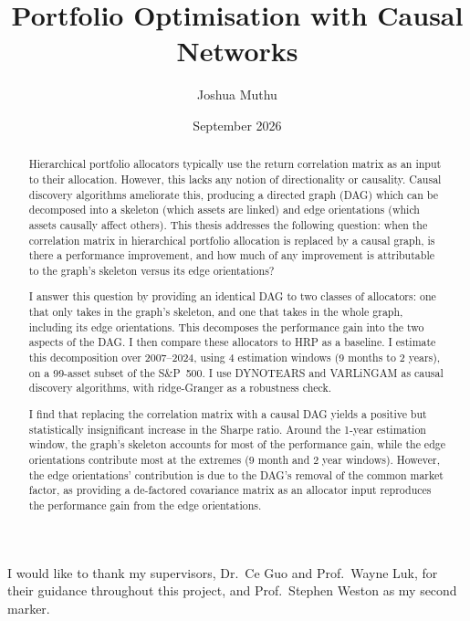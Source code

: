 \documentclass[12pt, a4paper]{report}
\title{Portfolio Optimisation with Causal Networks}
\author{Joshua Muthu}
\date{September 2026}
\begin{document}

\maketitle

\begin{abstract}
\noindent Hierarchical portfolio allocators typically use 
the return correlation matrix as an input to their allocation. 
However, this lacks any notion of directionality or causality.
Causal discovery algorithms ameliorate this, producing
a directed graph (DAG) which can be decomposed into a skeleton
(which assets are linked) and edge orientations
(which assets causally affect others).
This thesis addresses the following question: when the
correlation matrix in hierarchical portfolio allocation is
replaced by a causal graph, is there a performance
improvement, and how much of any improvement is attributable
to the graph's skeleton versus its edge orientations?

I answer this question by providing an identical DAG to
two classes of allocators: one that only takes in the graph's
skeleton, and one that takes in the whole graph, including its
edge orientations. This decomposes the performance gain into
the two aspects of the DAG. I then compare these allocators
to HRP as a baseline. I estimate this decomposition over 
2007--2024, using 4 estimation windows 
(9 months to 2 years), on a 99-asset subset of the S\&P~500. 
I use DYNOTEARS and VARLiNGAM as causal discovery algorithms,
with ridge-Granger as a robustness check.

I find that replacing the correlation matrix with a causal DAG
yields a positive but statistically insignificant increase 
in the Sharpe ratio. Around the 1-year estimation window,
the graph's skeleton accounts for most of the performance gain,
while the edge orientations contribute most at the extremes
(9 month and 2 year windows). However, the edge orientations'
contribution is due to the DAG's removal of the common
market factor, as providing a de-factored covariance matrix
as an allocator input reproduces the performance gain from the
edge orientations.
\end{abstract}

\begin{acknowledgements}
I would like to thank my supervisors, Dr.\ Ce Guo and Prof.\ Wayne Luk, for
their guidance throughout this project, and Prof.\ Stephen Weston as my second
marker.
\end{acknowledgements}
\end{document}
